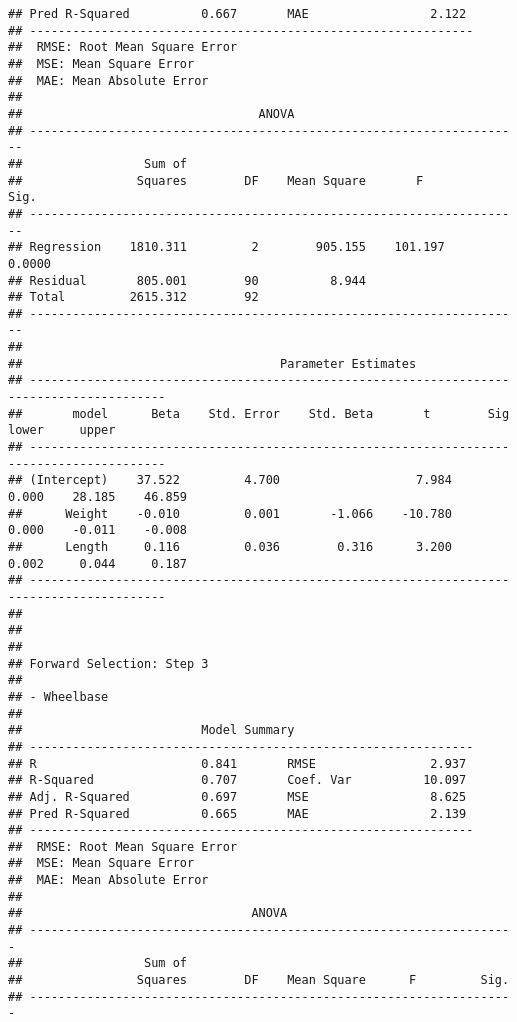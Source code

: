 \documentclass[
]{book}
\begin{document}
\begin{verbatim}
## Pred R-Squared          0.667       MAE                 2.122 
## --------------------------------------------------------------
##  RMSE: Root Mean Square Error 
##  MSE: Mean Square Error 
##  MAE: Mean Absolute Error 
## 
##                                 ANOVA                                 
## ---------------------------------------------------------------------
##                 Sum of                                               
##                Squares        DF    Mean Square       F         Sig. 
## ---------------------------------------------------------------------
## Regression    1810.311         2        905.155    101.197    0.0000 
## Residual       805.001        90          8.944                      
## Total         2615.312        92                                     
## ---------------------------------------------------------------------
## 
##                                    Parameter Estimates                                    
## -----------------------------------------------------------------------------------------
##       model      Beta    Std. Error    Std. Beta       t        Sig      lower     upper 
## -----------------------------------------------------------------------------------------
## (Intercept)    37.522         4.700                   7.984    0.000    28.185    46.859 
##      Weight    -0.010         0.001       -1.066    -10.780    0.000    -0.011    -0.008 
##      Length     0.116         0.036        0.316      3.200    0.002     0.044     0.187 
## -----------------------------------------------------------------------------------------
## 
## 
## 
## Forward Selection: Step 3 
## 
## - Wheelbase 
## 
##                         Model Summary                          
## --------------------------------------------------------------
## R                       0.841       RMSE                2.937 
## R-Squared               0.707       Coef. Var          10.097 
## Adj. R-Squared          0.697       MSE                 8.625 
## Pred R-Squared          0.665       MAE                 2.139 
## --------------------------------------------------------------
##  RMSE: Root Mean Square Error 
##  MSE: Mean Square Error 
##  MAE: Mean Absolute Error 
## 
##                                ANOVA                                 
## --------------------------------------------------------------------
##                 Sum of                                              
##                Squares        DF    Mean Square      F         Sig. 
## --------------------------------------------------------------------

\end{verbatim}
\end{document}

